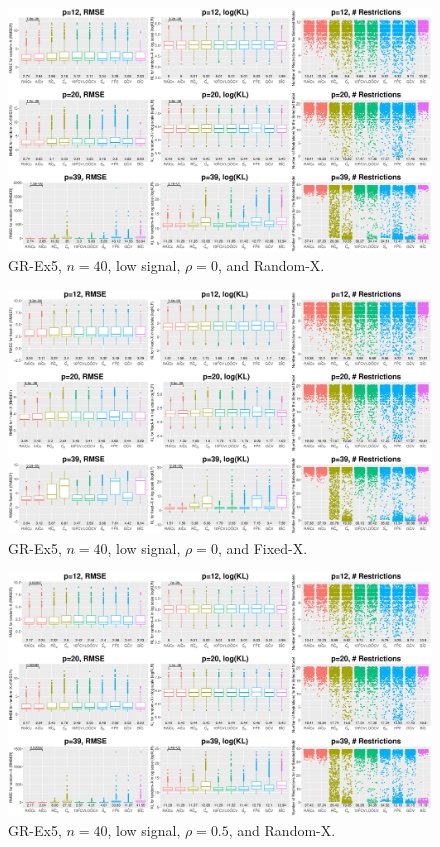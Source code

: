 \clearpage
\begin{figure}[!ht]
\centering
\includegraphics[width=\textwidth]{figures/supplement/randomx_GR-Ex5_n40_lsnr_rho0.eps}
\caption{GR-Ex5, $n=40$, low signal, $\rho=0$, and Random-X.}
\end{figure}
\begin{figure}[!ht]
\centering
\includegraphics[width=\textwidth]{figures/supplement/fixedx_GR-Ex5_n40_lsnr_rho0.eps}
\caption{GR-Ex5, $n=40$, low signal, $\rho=0$, and Fixed-X.}
\end{figure}
\clearpage
\begin{figure}[!ht]
\centering
\includegraphics[width=\textwidth]{figures/supplement/randomx_GR-Ex5_n40_lsnr_rho05.eps}
\caption{GR-Ex5, $n=40$, low signal, $\rho=0.5$, and Random-X.}
\end{figure}
